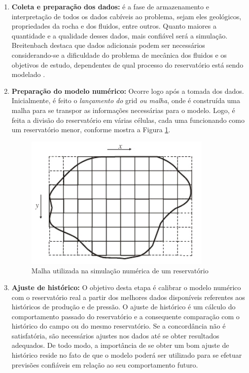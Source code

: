 \begin{enumerate}
\item \textbf{Coleta e prepara\c{c}\~{a}o dos dados:} \'{e} a fase de armazenamento e interpreta\c{c}\~{a}o de todos os dados cab\'{i}veis ao problema, sejam eles geol\'{o}gicos, propriedades da rocha e dos fluidos, entre outros. Quanto maiores a quantidade e a qualidade desses dados, mais confi\'{a}vel ser\'{a} a simula\c{c}\~{a}o. Breitenbach destaca que dados adicionais podem ser necessários considerando-se a dificuldade do problema de mecânica dos fluidos e os objetivos de estudo, dependentes de qual processo do reservatório está sendo modelado \cite{breitenbach1991}.
\item \textbf{Prepara\c{c}\~{a}o do modelo num\'{e}rico:} Ocorre logo ap\'{o}s a tomada dos dados. Inicialmente, \'{e} feito o \textit{lan\c{c}amento do} grid \textit{ou malha}, onde \'{e} constru\'{i}da uma malha para se transpor as informa\c{c}\~{o}es necess\'{a}rias para o modelo. Logo, \'{e} feita a divis\~{a}o do reservat\'{o}rio em v\'{a}rias c\'{e}lulas, cada uma funcionando como um reservat\'{o}rio menor, conforme mostra a Figura \ref{fig:revisao_simsec3}.
\begin{figure}[H]
	\centering
	\includegraphics[width=.5\textwidth]{figs/revisao/revisao_simsec3}
	\caption{Malha utilizada na simula\c{c}\~{a}o num\'{e}rica de um reservat\'{o}rio \cite[p. 524]{engres}}
	\label{fig:revisao_simsec3}
\end{figure}
\item \textbf{Ajuste de hist\'{o}rico:} O objetivo desta etapa \'{e} calibrar o modelo num\'{e}rico com o reservat\'{o}rio real a partir dos melhores dados dispon\'{i}veis referentes aos hist\'{o}ricos de produ\c{c}\~{a}o e de press\~{a}o. O ajuste de hist\'{o}rico \'{e} um c\'{a}lculo do comportamento passado do reservat\'{o}rio e a consequente compara\c{c}\~{a}o com o hist\'{o}rico do campo ou do mesmo reservat\'{o}rio. Se a concord\^{a}ncia n\~{a}o \'{e} satisfat\'{o}ria, s\~{a}o necess\'{a}rios ajustes nos dados at\'{e} se obter resultados adequados. De todo modo, a import\^{a}ncia de se obter um bom ajuste de hist\'{o}rico reside no fato de que o modelo poder\'{a} ser utilizado para se efetuar previs\~{o}es confi\'{a}veis em rela\c{c}\~{a}o ao seu comportamento futuro.

\end{enumerate}
